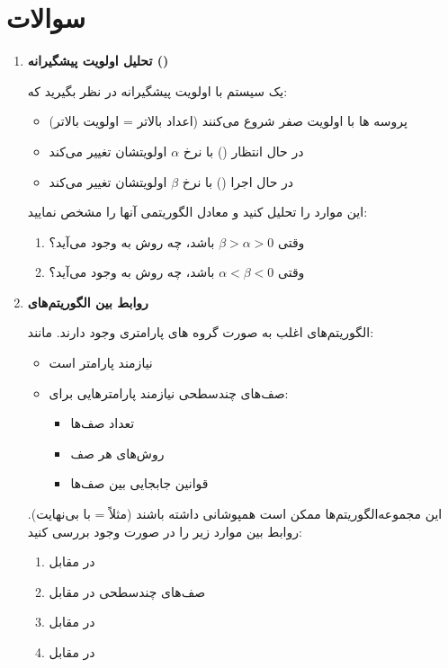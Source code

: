 \documentclass[12pt]{article}
\begin{document}
\section{سوالات}
\begin{enumerate}[rightmargin=1cm,leftmargin=2cm]

\item \textbf{تحلیل  اولویت پیشگیرانه ()}

یک سیستم  با اولویت پیشگیرانه در نظر بگیرید که:
\begin{itemize}
    \item {پروسه ها با اولویت صفر شروع می‌کنند (اعداد بالاتر = اولویت بالاتر)}
    \item {} در حال انتظار () با نرخ $\alpha$ اولویتشان تغییر می‌کند
    \item {} در حال اجرا () با نرخ $\beta$ اولویتشان تغییر می‌کند
\end{itemize}

این موارد را تحلیل کنید و معادل الگوریتمی آنها را مشخص نمایید:
\begin{enumerate}[label=(\harfi*)]
    \item وقتی $\beta > \alpha > 0$ باشد، چه روش  به وجود می‌آید؟
    \item وقتی $\alpha < \beta < 0$ باشد، چه روش  به وجود می‌آید؟
\end{enumerate}

\item \textbf{روابط بین الگوریتم‌های }

الگوریتم‌های  اغلب به صورت گروه های پارامتری وجود دارند. مانند:
\begin{itemize}
    \item {} نیازمند پارامتر  است
    \item صف‌های چندسطحی  نیازمند پارامترهایی برای:
    \begin{itemize}
        \item تعداد صف‌ها
        \item روش‌های  هر صف
        \item قوانین جابجایی  بین صف‌ها
    \end{itemize}
\end{itemize}

این مجموعه‌الگوریتم‌ها ممکن است همپوشانی داشته باشند (مثلاً  =  با  بی‌نهایت). روابط بین موارد زیر را در صورت وجود بررسی کنید:
\begin{enumerate}[label=(\harfi*)]
    \item {} در مقابل 
    \item صف‌های چندسطحی  در مقابل 
    \item {} در مقابل 
    \item {} در مقابل 
\end{enumerate}


\end{enumerate}
\end{document}
